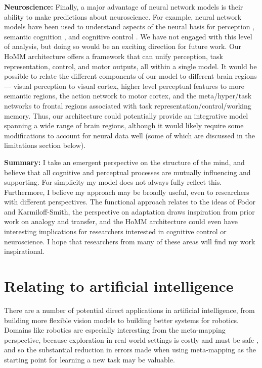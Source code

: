 \textbf{Neuroscience:} Finally, a major advantage of neural network models is their ability to make predictions about neuroscience. For example, neural network models have been used to understand aspects of the neural basis for perception \citep{Yamins2016a}, semantic cognition \citep{Rogers2004}, and cognitive control \citep{Shenhav2013}. We have not engaged with this level of analysis, but doing so would be an exciting direction for future work. Our HoMM architecture offers a framework that can unify perception, task representation, control, and motor outputs, all within a single model. It would be possible to relate the different components of our model to different brain regions --- visual perception to visual cortex, higher level perceptual features to more semantic regions, the action network to motor cortex, and the meta/hyper/task networks to frontal regions associated with task representation/control/working memory. Thus, our architecture could potentially provide an integrative model spanning a wide range of brain regions, although it would likely require some modifications to account for neural data well (some of which are discussed in the limitations section below). \par 

\textbf{Summary:} I take an emergent perspective on the structure of the mind, and believe that all cognitive and perceptual processes are mutually influencing and supporting. For simplicity my model does not always fully reflect this. Furthermore, I believe my approach may be broadly useful, even to researchers with different perspectives. The functional approach relates to the ideas of Fodor and Karmiloff-Smith, the perspective on adaptation draws inspiration from prior work on analogy and transfer, and the HoMM architecture could even have interesting implications for researchers interested in cognitive control or neuroscience. I hope that researchers from many of these areas will find my work inspirational.

\section{Relating to artificial intelligence}

There are a number of potential direct applications in artificial intelligence, from building more flexible vision models to building better systems for robotics. Domains like robotics are especially interesting from the meta-mapping perspective, because exploration in real world settings is costly and must be safe \citep{Turchetta2016}, and so the substantial reduction in errors made when using meta-mapping as the starting point for learning a new task may be valuable. \par 

